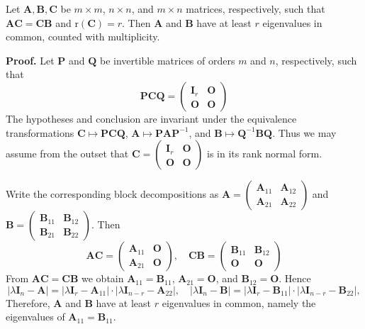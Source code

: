\documentclass[12pt, a4paper, oneside]{book}
\begin{document}
\begin{theorem}
    Let $\mathbf{A}, \mathbf{B}, \mathbf{C}$ be $m \times m$, $n \times n$, and $m \times n$ matrices, respectively, such that $\mathbf{A} \mathbf{C}={\mathbf{C} \mathbf{B}}$ and $\mathrm{r}(\mathbf{C})=r$. Then $\mathbf{A}$ and $\mathbf{B}$ have at least $r$ eigenvalues in common, counted with multiplicity.

    \textbf{Proof.}
    Let $\mathbf{P}$ and $\mathbf{Q}$ be invertible matrices of orders $m$ and $n$, respectively, such that
    \[\mathbf{P} \mathbf{C} \mathbf{Q}=\left(\begin{array}{ll}\mathbf{I}_r & \mathbf{O} \\ \mathbf{O} & \mathbf{O}\end{array}\right)
    \]
    The hypotheses and conclusion are invariant under the equivalence transformations $\mathbf{C} \mapsto \mathbf{P} \mathbf{C} \mathbf{Q}$, $\mathbf{A} \mapsto \mathbf{P} \mathbf{A} \mathbf{P}^{-1}$, and $\mathbf{B} \mapsto \mathbf{Q}^{-1} \mathbf{B} \mathbf{Q}$. Thus we may assume from the outset that $\mathbf{C}=\left(\begin{array}{ll}\mathbf{I}_r & \mathbf{O} \\ \mathbf{O} & \mathbf{O}\end{array}\right)$ is in its rank normal form.

    Write the corresponding block decompositions as $\mathbf{A}=\left(\begin{array}{ll}\mathbf{A}_{11} & \mathbf{A}_{12} \\ \mathbf{A}_{21} & \mathbf{A}_{22}\end{array}\right)$ and $\mathbf{B}=\left(\begin{array}{ll}\mathbf{B}_{11} & \mathbf{B}_{12} \\ \mathbf{B}_{21} & \mathbf{B}_{22}\end{array}\right)$. Then
    \[
        \mathbf{A} \mathbf{C}=\left(\begin{array}{ll}
                \mathbf{A}_{11} & \mathbf{O} \\
                \mathbf{A}_{21} & \mathbf{O}
            \end{array}\right), \quad \mathbf{C} \mathbf{B}=\left(\begin{array}{cc}
                \mathbf{B}_{11} & \mathbf{B}_{12} \\
                \mathbf{O}      & \mathbf{O}
            \end{array}\right)
    \]
    From $\mathbf{A} \mathbf{C}=\mathbf{C} \mathbf{B}$ we obtain $\mathbf{A}_{11}=\mathbf{B}_{11}$, $\mathbf{A}_{21}=\mathbf{O}$, and $\mathbf{B}_{12}=\mathbf{O}$. Hence
    \[
        \left|\lambda \mathbf{I}_n-\mathbf{A}\right|=\left|\lambda \mathbf{I}_r-\mathbf{A}_{11}\right| \cdot\left|\lambda \mathbf{I}_{n-r}-\mathbf{A}_{22}\right|, \quad\left|\lambda \mathbf{I}_n-\mathbf{B}\right|=\left|\lambda \mathbf{I}_r-\mathbf{B}_{11}\right| \cdot\left|\lambda \mathbf{I}_{n-r}-\mathbf{B}_{22}\right|,
    \]
    Therefore, $\mathbf{A}$ and $\mathbf{B}$ have at least $r$ eigenvalues in common, namely the eigenvalues of $\mathbf{A}_{11}=\mathbf{B}_{11}$.
\end{theorem}
\end{document}
